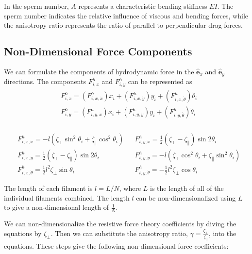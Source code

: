 \documentclass[12pt,letterpaper,titlepage]{article}
\newcommand{\uvec}[1]{\mathbf{\hat{#1}}}
\begin{document}
In the sperm number, $A$ represents a characteristic bending stiffness $EI$. The sperm number indicates the relative influence of viscous and bending forces, while the anisotropy ratio represents the ratio of parallel to perpendicular drag forces.

\newpage

\subsection{Non-Dimensional Force Components}
We can formulate the components of hydrodynamic force in the $\uvec{e}_x$ and $\uvec{e}_y$ directions. The components $F_{i,x}^h$ and $F_{i,y}^h$ can be represented as
\begin{align}
\begin{split}
&F_{i,x}^h = (F_{i,x,\dot{x}}^h) \dot{x}_i + (F_{i,x,\dot{y}}^h) \dot{y}_i + (F_{i,x,\dot{\theta}}^h) \dot{\theta}_i \\
&F_{i,y}^h = (F_{i,y,\dot{x}}^h) \dot{x}_i + (F_{i,y,\dot{y}}^h) \dot{y}_i + (F_{i,y,\dot{\theta}}^h) \dot{\theta}_i \\
\end{split}
\end{align}

\begin{align*}
&F_{i,x,\dot{x}}^h = - l (\zeta_{\bot} \sin^2 \theta_i + \zeta_{\parallel} \cos^2 \theta_i) & &F_{i,y,\dot{x}}^h =\frac{1}{2} (\zeta_{\bot} - \zeta_{\parallel} ) \sin 2 \theta_i \\
&F_{i,x,\dot{y}}^h = \frac{1}{2} (\zeta_{\bot} - \zeta_{\parallel} ) \sin 2 \theta_i & &F_{i,y,\dot{y}}^h =  - l (\zeta_{\bot} \cos^2 \theta_i + \zeta_{\parallel} \sin^2 \theta_i) \\
&F_{i,x,\dot{\theta}}^h = \frac{1}{2} l^2 \zeta_{\bot} \sin \theta_i & &F_{i,y,\dot{\theta}}^h = - \frac{1}{2} l^2 \zeta_{\bot} \cos \theta_i
\end{align*}

The length of each filament is $l = L/N$, where $L$ is the length of all of the individual filaments combined. The length $l$ can be non-dimensionalized using $L$ to give a non-dimensional length of $\frac{1}{N}$.

We can non-dimensionalize the resistive force theory coefficients by diving the equations by $\zeta_{\bot}$. Then we can substitute the anisotropy ratio, $\gamma = \frac{\zeta_{\bot}}{\zeta_{\parallel}}$, into the equations. These steps give the following non-dimensional force coefficients:
\end{document}

